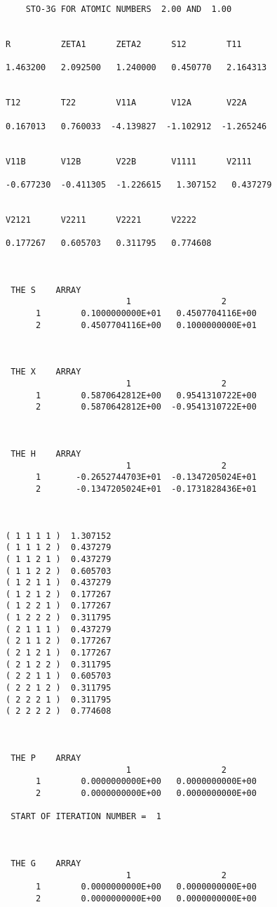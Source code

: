 \newpage
\begin{verbatim}
    STO-3G FOR ATOMIC NUMBERS  2.00 AND  1.00


R          ZETA1      ZETA2      S12        T11

1.463200   2.092500   1.240000   0.450770   2.164313


T12        T22        V11A       V12A       V22A

0.167013   0.760033  -4.139827  -1.102912  -1.265246


V11B       V12B       V22B       V1111      V2111

-0.677230  -0.411305  -1.226615   1.307152   0.437279


V2121      V2211      V2221      V2222

0.177267   0.605703   0.311795   0.774608



 THE S    ARRAY
                        1                  2
      1        0.1000000000E+01   0.4507704116E+00
      2        0.4507704116E+00   0.1000000000E+01



 THE X    ARRAY
                        1                  2
      1        0.5870642812E+00   0.9541310722E+00
      2        0.5870642812E+00  -0.9541310722E+00



 THE H    ARRAY
                        1                  2
      1       -0.2652744703E+01  -0.1347205024E+01
      2       -0.1347205024E+01  -0.1731828436E+01



( 1 1 1 1 )  1.307152
( 1 1 1 2 )  0.437279
( 1 1 2 1 )  0.437279
( 1 1 2 2 )  0.605703
( 1 2 1 1 )  0.437279
( 1 2 1 2 )  0.177267
( 1 2 2 1 )  0.177267
( 1 2 2 2 )  0.311795
( 2 1 1 1 )  0.437279
( 2 1 1 2 )  0.177267
( 2 1 2 1 )  0.177267
( 2 1 2 2 )  0.311795
( 2 2 1 1 )  0.605703
( 2 2 1 2 )  0.311795
( 2 2 2 1 )  0.311795
( 2 2 2 2 )  0.774608



 THE P    ARRAY
                        1                  2
      1        0.0000000000E+00   0.0000000000E+00
      2        0.0000000000E+00   0.0000000000E+00

 START OF ITERATION NUMBER =  1



 THE G    ARRAY
                        1                  2
      1        0.0000000000E+00   0.0000000000E+00
      2        0.0000000000E+00   0.0000000000E+00




\end{verbatim}
